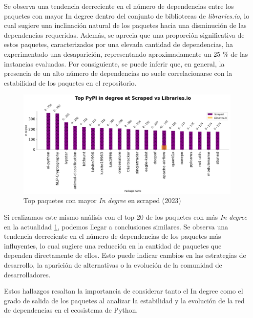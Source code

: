 Se observa una tendencia decreciente en el número de dependencias entre los paquetes con mayor In degree
dentro del conjunto de bibliotecas de \textit{libraries.io}, lo cual sugiere una inclinación natural de los
paquetes hacia una disminución de las dependencias requeridas. Además, se aprecia que una proporción significativa
de estos paquetes, caracterizados por una elevada cantidad de dependencias, ha experimentado una desaparición,
representando aproximadamente un 25 \% de las instancias evaluadas. Por consiguiente, se puede inferir que,
en general, la presencia de un alto número de dependencias no suele correlacionarse con la estabilidad de
los paquetes en el repositorio.

\begin{figure}[h!]
    \begin{center}
        \includegraphics[width=1\textwidth]{img/pypi/scraped_t20_ind_comparison.png}
        \caption{Top paquetes con mayor \textit{In degree} en scraped (2023)}
        \label{fig:pypi_scraped_ind_comparison}
    \end{center}
\end{figure}

Si realizamos este mismo análisis con el top 20 de los paquetes con más \textit{In degree} en la actualidad \ref{fig:pypi_scraped_ind_comparison}, podemos llegar a
conclusiones similares. Se observa una tendencia decreciente en el número de dependencias de los paquetes
más influyentes, lo cual sugiere una reducción en la cantidad de paquetes que dependen directamente de ellos.
Esto puede indicar cambios en las estrategias de desarrollo, la aparición de alternativas o la evolución de la
comunidad de desarrolladores.

Estos hallazgos resaltan la importancia de considerar tanto el In degree como el grado de salida de
los paquetes al analizar la estabilidad y la evolución de la red de dependencias en el ecosistema de Python.

